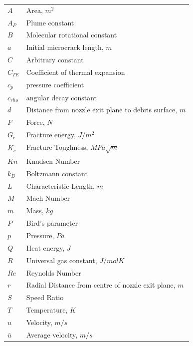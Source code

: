 \documentclass[journal]{new-aiaa}
\begin{document}
{\renewcommand\arraystretch{1.0}
\noindent\begin{longtable*}{@{}l @{\quad=\quad} l@{}}
$ A $ & Area, $m^2$ \\  
$ A_P $ & Plume constant \\ 
$ B $ & Molecular rotational constant \\ 
$ a $ & Initial microcrack length, $m$ \\
$ C $ & Arbitrary constant \\ 
$ C_{TE} $ & Coefficient of thermal expansion \\
$ c_p $ & pressure coefficient \\
$ c_{rho} $ & angular decay constant \\
$ d $ & Distance from nozzle exit plane to debris surface, $m$ \\ 
$ F $ & Force, $N$ \\ 
$ G_c $ & Fracture energy, $J/m^2$\\
$ K_c $ & Fracture Toughness, $MPa \sqrt{m}$ \\ 
$ Kn $ & Knudsen Number \\ 
$ k_B $ & Boltzmann constant \\ 
$ L $ & Characteristic Length, $m$ \\  
$ M $ & Mach Number \\   
$ m $ & Mass, $kg$ \\ 
$ P $ & Bird's parameter \\  
$ p $ & Pressure, $Pa$ \\ 
$ Q $ & Heat energy, $J$ \\  
$ R $ & Universal gas constant, $J/molK$ \\ 
$ Re $ & Reynolds Number \\  
$ r $ & Radial Distance from centre of nozzle exit plane, $m$ \\  
$ S $ & Speed Ratio \\ 
$ T $ & Temperature, $K$ \\  
$ u $ & Velocity, $m/s$ \\  
$ \bar{u} $ & Average velocity, $m/s$ \\  



 
 

\end{longtable*}}
\end{document}
